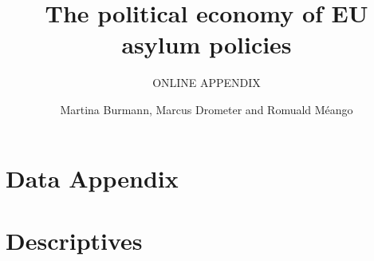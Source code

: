 \documentclass[11pt,a4paper]{scrartcl}
\begin{document}
	\title{The political economy of EU asylum policies}
	\subtitle{ONLINE APPENDIX}
	\author{Martina Burmann, Marcus Drometer and Romuald Méango}
	\maketitle

\tableofcontents

\clearpage
\FloatBarrier
\section{Data Appendix}

\clearpage
\FloatBarrier
\section{Descriptives}



\clearpage
\FloatBarrier
\end{document}
